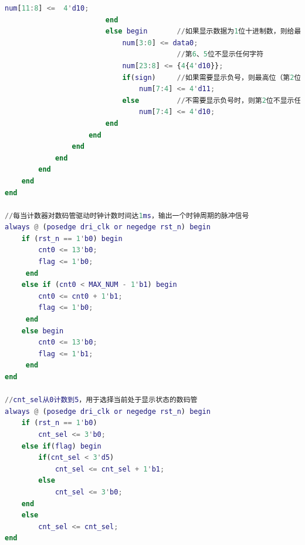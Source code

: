 \documentclass[UTF8]{article}
\theoremstyle{MyLineTheoremStyle} %
\theoremstyle{MyBlockTheoremStyle} %
\theoremstyle{MySubsubsectionStyle} %
\begin{document}
\begin{lstlisting}[language=Matlab, style=MatlabStyle_src]
                                num[11:8] <=  4'd10;
                        end
                        else begin       //如果显示数据为1位十进制数，则给最低位数码管赋值
                            num[3:0] <= data0;
                                         //第6、5位不显示任何字符
                            num[23:8] <= {4{4'd10}};
                            if(sign)     //如果需要显示负号，则最高位（第2位）为符号位
                                num[7:4] <= 4'd11;
                            else         //不需要显示负号时，则第2位不显示任何字符
                                num[7:4] <= 4'd10;
                        end
                    end
                end
            end
        end
    end
end

//每当计数器对数码管驱动时钟计数时间达1ms，输出一个时钟周期的脉冲信号
always @ (posedge dri_clk or negedge rst_n) begin
    if (rst_n == 1'b0) begin
        cnt0 <= 13'b0;
        flag <= 1'b0;
     end
    else if (cnt0 < MAX_NUM - 1'b1) begin
        cnt0 <= cnt0 + 1'b1;
        flag <= 1'b0;
     end
    else begin
        cnt0 <= 13'b0;
        flag <= 1'b1;
     end
end

//cnt_sel从0计数到5，用于选择当前处于显示状态的数码管
always @ (posedge dri_clk or negedge rst_n) begin
    if (rst_n == 1'b0)
        cnt_sel <= 3'b0;
    else if(flag) begin
        if(cnt_sel < 3'd5)
            cnt_sel <= cnt_sel + 1'b1;
        else
            cnt_sel <= 3'b0;
    end
    else
        cnt_sel <= cnt_sel;
end


\end{lstlisting}
\end{document}
